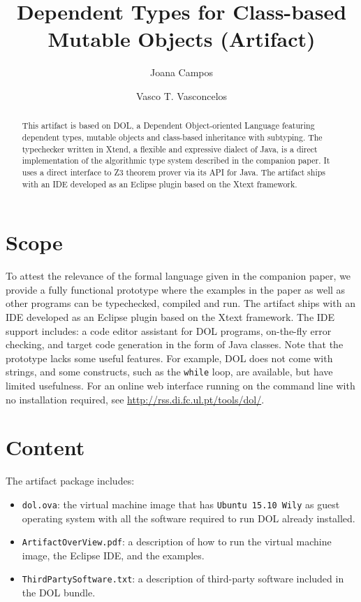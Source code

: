 \documentclass[a4paper,UKenglish]{darts-v2018}
\title{Dependent Types for Class-based Mutable Objects (Artifact)}
\author{Joana Campos}{LASIGE, Faculdade de Ciências, Universidade de Lisboa,
Portugal}{jcampos@lasige.di.fc.ul.pt}{https://orcid.org/0000-0002-2185-8175}{}%
\author{Vasco T. Vasconcelos}{LASIGE, Faculdade de Ciências, Universidade de
Lisboa, Portugal}{vv@di.fc.ul.pt}{https://orcid.org/0000-0002-9539-8861}{}
\newenvironment{scope}{\section{Scope}}{}
\newenvironment{content}{\section{Content}}{}
\begin{document}
\maketitle

\begin{abstract}
This artifact is based on DOL, a Dependent Object-oriented Language
featuring dependent types, mutable objects and class-based inheritance with
subtyping. The typechecker written in Xtend, a flexible and expressive
dialect of Java, is a direct implementation of the algorithmic type system
described in the companion paper. It uses a direct interface to Z3 theorem
prover via its API for Java. The artifact ships with an IDE developed as an
Eclipse plugin based on the Xtext framework.
 \end{abstract}


\begin{scope}
To attest the relevance of the formal language given in the companion paper, we
provide a fully functional prototype where the examples in the paper as well as
other programs can be typechecked, compiled and run. The artifact ships with an
IDE developed as an Eclipse plugin based on the Xtext framework. The IDE
support includes: a code editor assistant for DOL programs, on-the-fly error
checking, and target code generation in the form of Java classes. Note that the
prototype lacks some useful features. For example, DOL does not come with
strings, and some constructs, such as the \lstinline|while| loop, are
available, but have limited usefulness. For an online web interface running on
the command line with no installation required, see \url{http://rss.di.fc.ul.pt/tools/dol/}.
\end{scope}

\begin{content}
The artifact package includes:
\begin{itemize}  
  \item \lstinline|dol.ova|: the virtual machine image that has 
  \lstinline|Ubuntu 15.10 Wily| as guest operating system with all the software
  required to run DOL already installed.
  \item \lstinline|ArtifactOverView.pdf|: a description of how to run the
  virtual machine image, the Eclipse IDE, and the examples.
  \item \lstinline|ThirdPartySoftware.txt|: a description of third-party
  software included in the DOL bundle.
\end{itemize}
\end{content}
\end{document}
